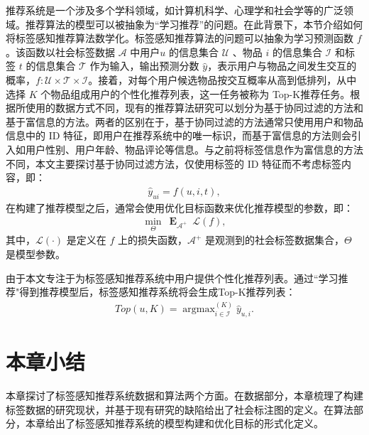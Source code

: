 推荐系统是一个涉及多个学科领域，如计算机科学、心理学和社会学等的广泛领域。推荐算法的模型可以被抽象为“学习推荐”的问题。在此背景下，本节介绍如何将标签感知推荐算法数学化。标签感知推荐算法的问题可以抽象为学习预测函数 $f$。该函数以社会标签数据 $\mathcal{A}$ 中用户$u$ 的信息集合 $\mathcal{U}$ 、物品 $i$ 的信息集合 $\mathcal{I}$ 和标签 $t$ 的信息集合 $\mathcal{T}$ 作为输入，输出预测分数 $\hat{y}$，表示用户与物品之间发生交互的概率，$f: \mathcal{U} \times \mathcal{T} \times \mathcal{I}$。接着，对每个用户候选物品按交互概率从高到低排列，从中选择 $K$ 个物品组成用户的个性化推荐列表，这一任务被称为 Top-K推荐任务。根据所使用的数据方式不同，现有的推荐算法研究可以划分为基于协同过滤的方法和基于富信息的方法\cite{wu_survey_2022}。两者的区别在于，基于协同过滤的方法通常只使用用户和物品信息中的 ID 特征，即用户在推荐系统中的唯一标识，而基于富信息的方法则会引入如用户性别、用户年龄、物品评论等信息。与之前将标签信息作为富信息的方法不同\cite{zuo_tag-aware_2016,xu_dspr_2016,chen_airec_2021}，本文主要探讨基于协同过滤方法，仅使用标签的 ID 特征而不考虑标签内容，即：
\begin{gather}
    \hat{y}_{ui} = f(u, i, t),
\end{gather}
在构建了推荐模型之后，通常会使用优化目标函数来优化推荐模型的参数，即：
\begin{gather}
    \mathop{min}_{\Theta} ~ \mathop{\mathbf{E}}_{\mathcal{A}^+} ~ \mathcal{L}(f),
\end{gather}
其中，$\mathcal{L}(\cdot)$ 是定义在 $f$ 上的损失函数，$\mathcal{A}^+$ 是观测到的社会标签数据集合，$\Theta$ 是模型参数。

由于本文专注于为标签感知推荐系统中用户提供个性化推荐列表。通过“学习推荐"得到推荐模型后，标签感知推荐系统将会生成Top-K推荐列表：
\begin{gather}
    Top(u, K) = \mathop{argmax}^{(K)}_{i\in \mathcal{I}}\hat{y}_{u,i}.
\end{gather}

\section{本章小结}
本章探讨了标签感知推荐系统数据和算法两个方面。在数据部分，本章梳理了构建标签数据的研究现状，并基于现有研究的缺陷给出了社会标注图的定义。在算法部分，本章给出了标签感知推荐系统的模型构建和优化目标的形式化定义。